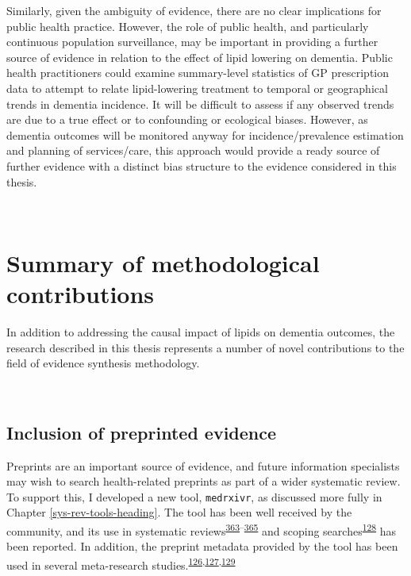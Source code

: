 \documentclass[a4paper, twoside]{templates/ociamthesis}
\begin{document}
Similarly, given the ambiguity of evidence, there are no clear implications for public health practice. However, the role of public health, and particularly continuous population surveillance, may be important in providing a further source of evidence in relation to the effect of lipid lowering on dementia. Public health practitioners could examine summary-level statistics of GP prescription data to attempt to relate lipid-lowering treatment to temporal or geographical trends in dementia incidence. It will be difficult to assess if any observed trends are due to a true effect or to confounding or ecological biases. However, as dementia outcomes will be monitored anyway for incidence/prevalence estimation and planning of services/care, this approach would provide a ready source of further evidence with a distinct bias structure to the evidence considered in this thesis.

~

\hypertarget{summary-of-methodological-contributions}{%
\section{Summary of methodological contributions}\label{summary-of-methodological-contributions}}

In addition to addressing the causal impact of lipids on dementia outcomes, the research described in this thesis represents a number of novel contributions to the field of evidence synthesis methodology.

~

\hypertarget{inclusion-of-preprinted-evidence}{%
\subsection{Inclusion of preprinted evidence}\label{inclusion-of-preprinted-evidence}}

Preprints are an important source of evidence, and future information specialists may wish to search health-related preprints as part of a wider systematic review. To support this, I developed a new tool, \texttt{medrxivr}, as discussed more fully in Chapter \ref{sys-rev-tools-heading}. The tool has been well received by the community, and its use in systematic reviews\textsuperscript{\protect\hyperlink{ref-imai2021}{363}--\protect\hyperlink{ref-hamilton2021}{365}} and scoping searches\textsuperscript{\protect\hyperlink{ref-grassly2020}{128}} has been reported. In addition, the preprint metadata provided by the tool has been used in several meta-research studies.\textsuperscript{\protect\hyperlink{ref-kodvanj2020}{126},\protect\hyperlink{ref-noone2020}{127},\protect\hyperlink{ref-mcguinness2020DAScomparison}{129}}
\end{document}
